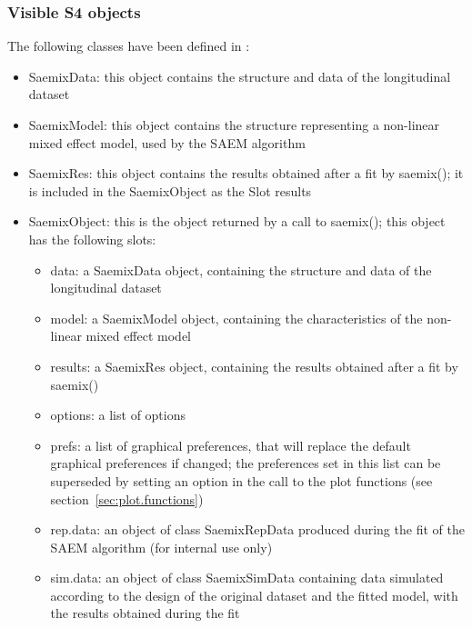 \subsubsection{Visible S4 objects}

The following classes have been defined in \monolix:
\begin{itemize}
\item {\sf SaemixData}: this object contains the structure and data of the longitudinal dataset
\item {\sf SaemixModel}: this object contains the structure representing a non-linear mixed effect model, used by the {\sf SAEM} algorithm
\item {\sf SaemixRes}: this object contains the results obtained after a fit by {\sf saemix()}; it is included in the {\sf SaemixObject} as the Slot {\sf results}
\item {\sf SaemixObject}: this is the object returned by a call to {\sf saemix()}; this object has the following slots:
   \begin{itemize}
   \item data: a {\sf SaemixData} object, containing the structure and data of the longitudinal dataset
   \item model: a {\sf SaemixModel} object, containing the characteristics of the non-linear mixed effect model
   \item results: a {\sf SaemixRes} object, containing the results obtained after a fit by {\sf saemix()}
   \item options: a list of options
   \item prefs: a list of graphical preferences, that will replace the default graphical preferences if changed; the preferences set in this list can be superseded by setting an option in the call to the plot functions (see section~\ref{sec:plot.functions})
   \item rep.data: an object of class {\sf SaemixRepData} produced during the fit of the {\sf SAEM} algorithm (for internal use only)
   \item sim.data: an object of class {\sf SaemixSimData} containing data simulated according to the design of the original dataset and the fitted model, with the results obtained during the fit
   \end{itemize}
\end{itemize}

